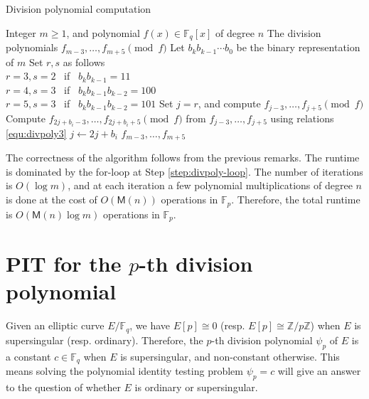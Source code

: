 \documentclass[11pt]{article}
\theoremstyle{plain}
\theoremstyle{definition}
\def\Z{\ensuremath{\mathbb{Z}}}
\def\F{\ensuremath{\mathbb{F}}}
\def\MM{\ensuremath{\mathsf{M}}}
\begin{document}
\begin{algorithm}[H]
	\caption{Division polynomial computation}
	\label{alg:divpoly-comp}
	\begin{algorithmic}[1]
		\Require Integer $m \ge 1$, and polynomial $f(x) \in \F_q[x]$ of degree $n$
		\Ensure The division polynomials $f_{m - 3}, \dots, f_{m + 5} \pmod{f}$
		\State Let $b_kb_{k - 1} \cdots b_0$ be the binary representation of $m$
		\State Set $r, s$ as follows \\
		$r = 3, s = 2$~ if~ $b_kb_{k - 1} = 11$ \\
		$r = 4, s = 3$~ if~ $b_kb_{k - 1}b_{k - 2} = 100$ \\
		$r = 5, s = 3$~ if~ $b_kb_{k - 1}b_{k - 2} = 101$
		\State Set $j = r$, and compute $f_{j - 3}, \dots, f_{j + 5} \pmod{f}$
		\label{step:divpoly-loop} 
			\State Compute $f_{2j + b_i - 3}, \dots, f_{2j + b_i + 5} \pmod{f}$ from $f_{j - 3}, 
			\dots, f_{j + 5}$ using relations \eqref{equ:divpoly3}
			\State $j \leftarrow 2j + b_i$
		\EndFor
		\State \Return $f_{m - 3}, \dots, f_{m + 5}$
	\end{algorithmic}
\end{algorithm}

The correctness of the algorithm follows from the previous remarks. The runtime is dominated by 
the for-loop at Step \ref{step:divpoly-loop}. The number of iterations is $O(\log m)$, and at each 
iteration a few polynomial multiplications of degree $n$ is done at the cost of $O(\MM(n))$ 
operations in $\F_p$. Therefore, the total runtime is $O(\MM(n)\log m)$ operations in $\F_p$.




\section{PIT for the $p$-th division polynomial}
\label{sec:pit-for-div}

Given an elliptic curve $E/\F_q$, we have $E[p] \cong 0$ (resp. $E[p] \cong \Z / p\Z$) when $E$ is 
supersingular (resp. ordinary). Therefore, the $p$-th division polynomial $\psi_p$ of $E$ is a 
constant $c \in \F_q$ when $E$ is supersingular, and non-constant otherwise. This means solving the 
polynomial identity testing problem $\psi_p = c$ will give an answer to the question of whether $E$ 
is ordinary or supersingular. 
\end{document}
